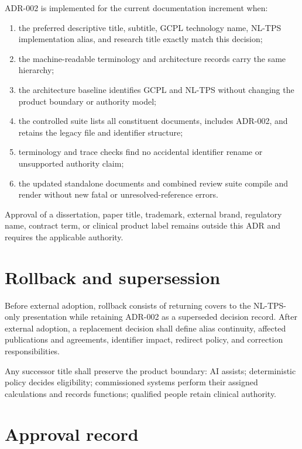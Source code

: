 \documentclass[11pt,letterpaper]{article}
\begin{document}
ADR-002 is implemented for the current documentation increment when:

\begin{enumerate}
\item the preferred descriptive title, subtitle, GCPL technology name, NL-TPS implementation alias, and research title exactly match this decision;
\item the machine-readable terminology and architecture records carry the same hierarchy;
\item the architecture baseline identifies GCPL and NL-TPS without changing the product boundary or authority model;
\item the controlled suite lists all constituent documents, includes ADR-002, and retains the legacy file and identifier structure;
\item terminology and trace checks find no accidental identifier rename or unsupported authority claim;
\item the updated standalone documents and combined review suite compile and render without new fatal or unresolved-reference errors.
\end{enumerate}

Approval of a dissertation, paper title, trademark, external brand, regulatory name, contract term, or clinical product label remains outside this ADR and requires the applicable authority.

\section{Rollback and supersession}

Before external adoption, rollback consists of returning covers to the NL-TPS-only presentation while retaining ADR-002 as a superseded decision record. After external adoption, a replacement decision shall define alias continuity, affected publications and agreements, identifier impact, redirect policy, and correction responsibilities.

Any successor title shall preserve the product boundary: AI assists; deterministic policy decides eligibility; commissioned systems perform their assigned calculations and records functions; qualified people retain clinical authority.

{}
\section*{Approval record}
\end{document}
